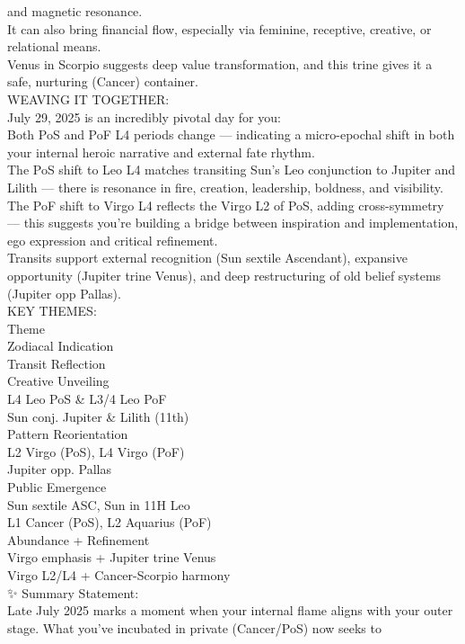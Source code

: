 \documentclass{article}
\begin{document}
and magnetic resonance.\\
It can also bring financial flow, especially via feminine, receptive,
creative, or relational means.\\
Venus in Scorpio suggests deep value transformation, and this trine
gives it a safe, nurturing (Cancer) container.\\
 WEAVING IT TOGETHER:\\
July 29, 2025 is an incredibly pivotal day for you:\\
Both PoS and PoF L4 periods change --- indicating a micro-epochal shift
in both your internal heroic narrative and external fate rhythm.\\
The PoS shift to Leo L4 matches transiting Sun's Leo conjunction to
Jupiter and Lilith --- there is resonance in fire, creation, leadership,
boldness, and visibility.\\
The PoF shift to Virgo L4 reflects the Virgo L2 of PoS, adding
cross-symmetry --- this suggests you're building a bridge between
inspiration and implementation, ego expression and critical
refinement.\\
Transits support external recognition (Sun sextile Ascendant), expansive
opportunity (Jupiter trine Venus), and deep restructuring of old belief
systems (Jupiter opp Pallas).\\
 KEY THEMES:\\
Theme\\
Zodiacal Indication\\
Transit Reflection\\
Creative Unveiling\\
L4 Leo PoS \& L3/4 Leo PoF\\
Sun conj. Jupiter \& Lilith (11th)\\
Pattern Reorientation\\
L2 Virgo (PoS), L4 Virgo (PoF)\\
Jupiter opp. Pallas\\
Public Emergence\\
Sun sextile ASC, Sun in 11H Leo\\
L1 Cancer (PoS), L2 Aquarius (PoF)\\
Abundance + Refinement\\
Virgo emphasis + Jupiter trine Venus\\
Virgo L2/L4 + Cancer-Scorpio harmony\\
✨ Summary Statement:\\
Late July 2025 marks a moment when your internal flame aligns with your
outer stage. What you've incubated in private (Cancer/PoS) now seeks to
\end{document}
